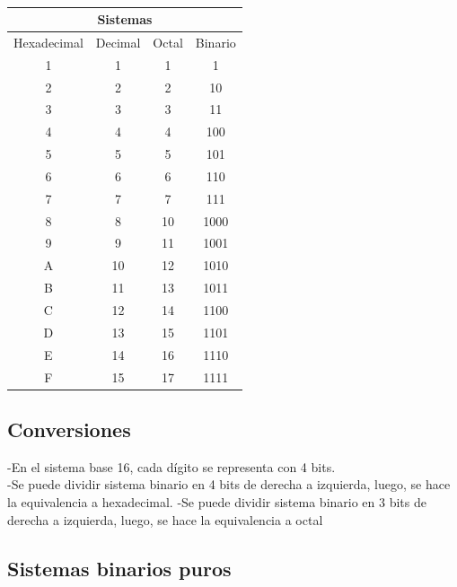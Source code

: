 \documentclass[12pt,letterpaper]{book}
\begin{document}
                                 
\begin{table}[H]
        \caption{}
        \label{sistemas}
        \begin{center}
        \begin{tabular}{|c||c||c||c|}
        \hline
        \multicolumn{4}{|c|}{Sistemas} \\ \hline    
        
        Hexadecimal&Decimal &Octal &Binario \\ \hline        
		        1&1&1&1\\ \hline
		        2&2&2&10\\ \hline
		        3&3&3&11\\ \hline
		        4&4&4&100\\ \hline
		        5&5&5&101\\ \hline
		        6&6&6&110\\ \hline
		        7&7&7&111\\ \hline
		        8&8&10&1000\\ \hline
		        9&9&11&1001\\ \hline
		        A&10&12&1010\\ \hline
		        B&11&13&1011\\ \hline
		        C&12&14&1100\\ \hline
		        D&13&15&1101\\ \hline
		        E&14&16&1110\\ \hline
		        F&15&17&1111\\ \hline
		        
        
        \end{tabular}
        \end{center}
    \end{table}
    \vspace{0.2 cm}
    
   \subsection{Conversiones}
   -En el sistema base 16, cada dígito se representa con 4 bits.\\
   -Se puede dividir sistema binario en 4 bits de derecha a izquierda, luego, se hace la equivalencia a hexadecimal.
   -Se puede dividir sistema binario en 3 bits de derecha a izquierda, luego, se hace la equivalencia a octal
   
   
    \subsection{Sistemas binarios puros}
    
\end{document}
